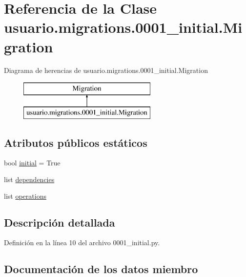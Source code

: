 \hypertarget{classusuario_1_1migrations_1_10001__initial_1_1_migration}{}\section{Referencia de la Clase usuario.\+migrations.0001\+\_\+initial.Migration}
\label{classusuario_1_1migrations_1_10001__initial_1_1_migration}
Diagrama de herencias de usuario.\+migrations.0001\+\_\+initial.Migration\begin{figure}[H]
\begin{center}
\leavevmode
\includegraphics[height=2.000000cm]{classusuario_1_1migrations_1_10001__initial_1_1_migration}
\end{center}
\end{figure}
\subsection*{Atributos públicos estáticos}
\begin{DoxyCompactItemize}
\item 
bool \hyperlink{classusuario_1_1migrations_1_10001__initial_1_1_migration_a01da22f440a0a2a8568d17e4c69a0c3d}{initial} = True
\item 
list \hyperlink{classusuario_1_1migrations_1_10001__initial_1_1_migration_a32994120f3e7f243508e979f839b7733}{dependencies}
\item 
list \hyperlink{classusuario_1_1migrations_1_10001__initial_1_1_migration_a1b1e2cc8f6749112d5582bb47942df78}{operations}
\end{DoxyCompactItemize}


\subsection{Descripción detallada}


Definición en la línea 10 del archivo 0001\+\_\+initial.\+py.



\subsection{Documentación de los datos miembro}
